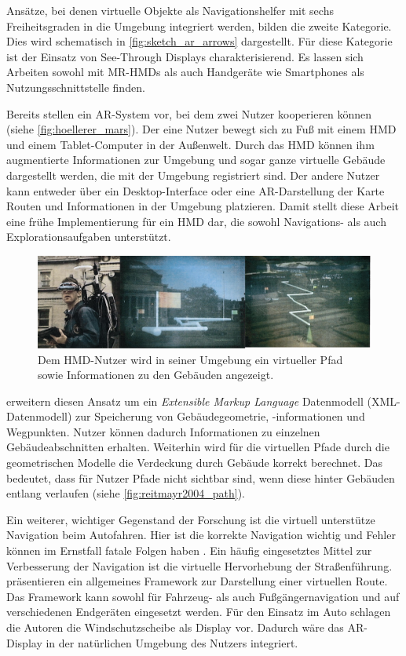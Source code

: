 Ansätze, bei denen virtuelle Objekte als Navigationshelfer mit sechs Freiheitsgraden in die Umgebung integriert werden, bilden die zweite Kategorie.
Dies wird schematisch in \autoref{fig:sketch_ar_arrows} dargestellt.
Für diese Kategorie ist der Einsatz von See-Through Displays charakterisierend.
Es lassen sich Arbeiten sowohl mit MR-HMDs als auch Handgeräte wie Smartphones als Nutzungsschnittstelle finden.

Bereits \textcite{Hoellerer1999} stellen ein AR-System vor, bei dem zwei Nutzer kooperieren können (siehe \autoref{fig:hoellerer_mars}).
Der eine Nutzer bewegt sich zu Fuß mit einem HMD und einem Tablet-Computer in der Außenwelt.
Durch das HMD können ihm augmentierte Informationen zur Umgebung und sogar ganze virtuelle Gebäude dargestellt werden, die mit der Umgebung registriert sind.
Der andere Nutzer kann entweder über ein Desktop-Interface oder eine AR-Darstellung der Karte Routen und Informationen in der Umgebung platzieren.
Damit stellt diese Arbeit eine frühe Implementierung für ein HMD dar, die sowohl Navigations- als auch Explorationsaufgaben unterstützt.
\begin{figure}
    \centering
    \includegraphics[width=\textwidth]{figures/hoellerer_ar_mars}
    \caption{Dem HMD-Nutzer wird in seiner Umgebung ein virtueller Pfad sowie Informationen zu den Gebäuden angezeigt. }
    \label{fig:hoellerer_mars}
\end{figure}

\textcite{Reitmayr2004} erweitern diesen Ansatz um ein \emph{Extensible Markup Language} Datenmodell (XML-Datenmodell) zur Speicherung von Gebäudegeometrie, -informationen und Wegpunkten.
Nutzer können dadurch Informationen zu einzelnen Gebäudeabschnitten erhalten.
Weiterhin wird für die virtuellen Pfade durch die geometrischen Modelle die Verdeckung durch Gebäude korrekt berechnet.
Das bedeutet, dass für Nutzer Pfade nicht sichtbar sind, wenn diese hinter Gebäuden entlang verlaufen (siehe \autoref{fig:reitmayr2004_path}).

Ein weiterer, wichtiger Gegenstand der Forschung ist die virtuell unterstütze Navigation beim Autofahren.
Hier ist die korrekte Navigation wichtig und Fehler können im Ernstfall fatale Folgen haben \parencite{Lin2017}.
Ein häufig eingesetztes Mittel zur Verbesserung der Navigation ist die virtuelle Hervorhebung der Straßenführung.
\textcite{Narzt2006} präsentieren ein allgemeines Framework zur Darstellung einer virtuellen Route.
Das Framework kann sowohl für Fahrzeug- als auch Fußgängernavigation und auf verschiedenen Endgeräten eingesetzt werden.
Für den Einsatz im Auto schlagen die Autoren die Windschutzscheibe als Display vor.
Dadurch wäre das AR-Display in der natürlichen Umgebung des Nutzers integriert.

